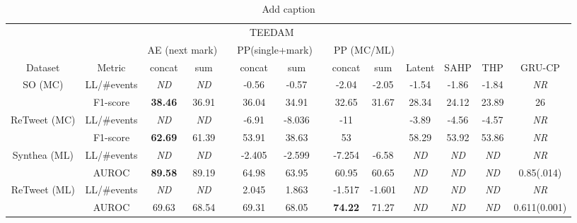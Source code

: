\documentclass[journal,twoside,web]{ieeecolor}
\begin{document}
\begin{table}[htbp]
    \centering
    \caption{Add caption}
      \begin{tabular}{cccccccccccccc}
      \toprule
      \toprule
            &       & \multicolumn{8}{c}{TEEDAM}                                    &       &       &       &  \\
  \cmidrule{3-10}          &       & \multicolumn{2}{c}{AE (next mark)} &       & \multicolumn{2}{c}{PP(single+mark)} &       & \multicolumn{2}{c}{PP (MC/ML)} &       &       &       &  \\
  \cmidrule{3-4}\cmidrule{6-7}\cmidrule{9-10}    Dataset & Metric & concat & sum   &       & concat & sum   &       & concat & sum   & Latent & SAHP  & THP   & GRU-CP \\
      \midrule
      \multirow{2}[2]{*}{SO (MC)} & LL/\#events & \textit{ND} & \textit{ND} &       & -0.56 & -0.57 &       & -2.04 & -2.05 & -1.54 & -1.86 & -1.84 & \textit{NR} \\
            & F1-score & \textbf{38.46} & 36.91 &       & 36.04 & 34.91 &       & 32.65 & 31.67 & 28.34 & 24.12 & 23.89 & 26 \\
      \midrule
      \multirow{2}[2]{*}{ReTweet (MC)} & LL/\#events & \textit{ND} & \textit{ND} &       & -6.91 & -8.036 &       & -11   &       & -3.89 & -4.56 & -4.57 & \textit{NR} \\
            & F1-score & \textbf{62.69} & 61.39 &       & 53.91 & 38.63 &       & 53    &       & 58.29 & 53.92 & 53.86 & \textit{NR} \\
      \midrule
      \multirow{2}[2]{*}{Synthea (ML)} & LL/\#events & \textit{ND} & \textit{ND} &       & -2.405 & -2.599 &       & -7.254 & -6.58 & \textit{ND} & \textit{ND} & \textit{ND} & \textit{NR} \\
            & AUROC & \textbf{89.58} & 89.19 &       & 64.98 & 63.95 &       & 60.95 & 60.65 & \textit{ND} & \textit{ND} & \textit{ND} & 0.85(.014) \\
      \midrule
      \multirow{2}[2]{*}{ReTweet (ML)} & LL/\#events & \textit{ND} & \textit{ND} &       & 2.045 & 1.863 &       & -1.517 & -1.601 & \textit{ND} & \textit{ND} & \textit{ND} & \textit{NR} \\
            & AUROC & 69.63 & 68.54 &       & 69.31 & 68.05 &       & \textbf{74.22} & 71.27 & \textit{ND} & \textit{ND} & \textit{ND} & 0.611(0.001) \\
      \bottomrule
      \bottomrule
      \end{tabular}%
    \label{tab:1}%
  \end{table}%
  
\end{document}
